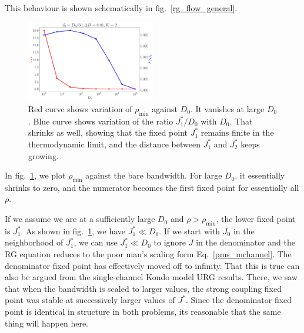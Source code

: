 \documentclass[12pt]{revtex4-2}
\begin{document}
This behaviour is shown schematically in fig.~\ref{rg_flow_general}. 
\begin{figure}[!htb]
	\centering
	\includegraphics[width=0.5\textwidth]{./rhomin_D.pdf}
	\caption{Red curve shows variation of \(\rho_\text{min}\) against \(D_0\). It vanishes at large \(D_0\). Blue curve shows variation of the ratio \(J_1^* / D_0\) with \(D_0\). That shrinks as well, showing that the fixed point \(J_1^*\) remains finite in the thermodynamic limit, and the distance between \(J_1^*\) and \(J_2^*\) keeps growing.}
	\label{rhomin_vs_D}
\end{figure}
In fig.~\ref{rhomin_vs_D}, we plot \(\rho_\text{min}\) against the bare bandwidth. For large \(D_0\), it essentially shrinks to zero, and the numerator becomes the first fixed point for essentially all \(\rho\).

If we assume we are at a sufficiently large \(D_0\) and \(\rho > \rho_\text{min}\), the lower fixed point is \(J_1^*\). As shown in fig.~\ref{rhomin_vs_D}, we have \(J_1^* \ll D_0\). If we start with \(J_0\) in the neighborhood of \(J_1^*\), we can use \(J_1^* \ll D_0\) to ignore \(J\) in the denominator and the RG equation reduces to the poor man's scaling form Eq.~\ref{pms_mchannel}. The denominator fixed point has effectively moved off to infinity. That this is true can also be argued from the single-channel Kondo model URG results. There, we saw that when the bandwidth is scaled to larger values, the strong coupling fixed point was stable at successively larger values of \(J^*\). Since the denominator fixed point is identical in structure in both problems, its reasonable that the same thing will happen here.
\end{document}
